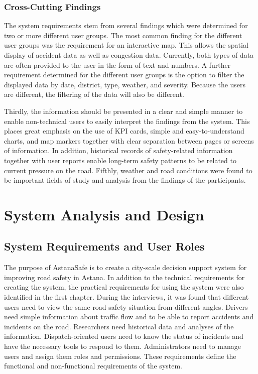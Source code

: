 ﻿\documentclass[12pt,a4paper]{report}
\begin{document}
\subsection{Cross-Cutting Findings}

The system requirements stem from several findings which were determined for two or more different user groups. The most common finding for the different user groups was the requirement for an interactive map. This allows the spatial display of accident data as well as congestion data. Currently, both types of data are often provided to the user in the form of text and numbers. A further requirement determined for the different user groups is the option to filter the displayed data by date, district, type, weather, and severity. Because the users are different, the filtering of the data will also be different.

Thirdly, the information should be presented in a clear and simple manner to enable non-technical users to easily interpret the findings from the system. This places great emphasis on the use of KPI cards, simple and easy-to-understand charts, and map markers together with clear separation between pages or screens of information. In addition, historical records of safety-related information together with user reports enable long-term safety patterns to be related to current pressure on the road. Fifthly, weather and road conditions were found to be important fields of study and analysis from the findings of the participants.

\chapter{System Analysis and Design}

\section{System Requirements and User Roles}

The purpose of AstanaSafe is to create a city-scale decision support system for improving road safety in Astana. In addition to the technical requirements for creating the system, the practical requirements for using the system were also identified in the first chapter. During the interviews, it was found that different users need to view the same road safety situation from different angles. Drivers need simple information about traffic flow and to be able to report accidents and incidents on the road. Researchers need historical data and analyses of the information. Dispatch-oriented users need to know the status of incidents and have the necessary tools to respond to them. Administrators need to manage users and assign them roles and permissions. These requirements define the functional and non-functional requirements of the system.
\end{document}
